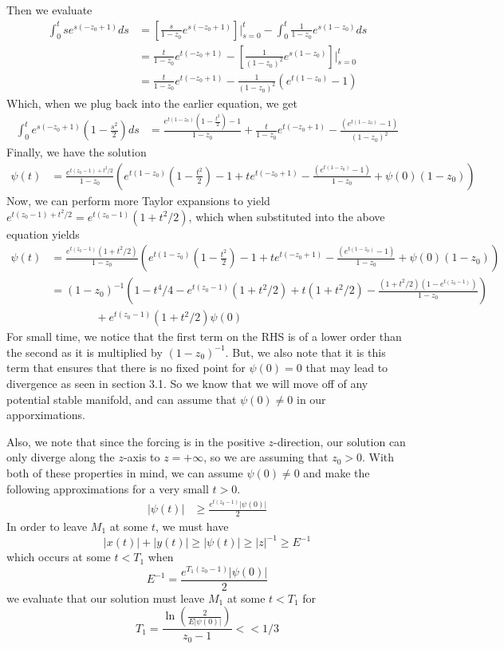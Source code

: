 \documentclass[11pt]{article}
\begin{document}
Then we evaluate 
\begin{align*}
    \int_0^t se^{s(-z_0 + 1)}ds &= \left[ \frac{s}{1- z_0} e^{s(-z_0 + 1)} \right]\bigg\rvert_{s = 0}^t - \int_0^t \frac{1}{1 - z_0}e^{s(1 - z_0)}ds\\
    &= \frac{t}{1- z_0} e^{t(-z_0 + 1)} - \left[ \frac{1}{(1-z_0)^2}e^{s(1 - z_0)} \right]\bigg\rvert_{s = 0}^t \\
    &= \frac{t}{1- z_0} e^{t(-z_0 + 1)} -  \frac{1}{(1-z_0)^2}\left(e^{t(1 - z_0)} - 1\right) 
\end{align*}
Which, when we plug back into the earlier equation, we get
\begin{align*}
    \int_0^t e^{s(-z_0 + 1)}\left(1 - \frac{s^2}{2}\right)ds &= \frac{e^{t(1-z_0)}\left( 1 - \frac{t^2}{2} \right) - 1}{1 - z_0} + \frac{t}{1- z_0} e^{t(-z_0 + 1)} -  \frac{\left(e^{t(1 - z_0)} - 1\right)}{(1-z_0)^2}
\end{align*}
Finally, we have the solution
\begin{align*}
    \psi(t) &=\frac{e^{t(z_0 - 1) + t^2/2}}{1-z_0}\left(e^{t(1-z_0)}\left( 1 - \frac{t^2}{2} \right) - 1 + t e^{t(-z_0 + 1)} -  \frac{\left(e^{t(1 - z_0)} - 1\right)}{1-z_0} + \psi(0)(1-z_0) \right)
\end{align*}
Now, we can perform more Taylor expansions to yield $e^{t(z_0 - 1) + t^2/2} = e^{t(z_0 - 1)}(1 + t^2/2)$, which when substituted into the above equation yields 
\begin{align*}
    \psi(t) &= \frac{e^{t(z_0 - 1)}(1 + t^2/2)}{1-z_0}\left(e^{t(1-z_0)}\left( 1 - \frac{t^2}{2} \right) - 1 + t e^{t(-z_0 + 1)} -  \frac{\left(e^{t(1 - z_0)} - 1\right)}{1-z_0} + \psi(0)(1-z_0) \right)\\
    &= (1-z_0)^{-1}\left(1 - t^4/4 - e^{t(z_0 - 1)}(1 + t^2/2) + t(1 + t^2/2) - \frac{(1 + t^2/2)(1 - e^{t(z_0 - 1)})}{1-z_0} \right)\\ &\qquad \qquad  + e^{t(z_0 - 1)}(1 + t^2/2)\psi(0)
\end{align*}
For small time, we notice that the first term on the RHS is of a lower order than the second as it is multiplied by $(1-z_0)^{-1}$. But, we also note that it is this term that ensures that there is no fixed point for $\psi(0) = 0$ that may lead to divergence as seen in section 3.1. So we know that we will move off of any potential stable manifold, and can assume that $\psi(0) \neq 0$ in our apporximations. 

Also, we note that since the forcing is in the positive $z$-direction, our solution can only diverge along the $z$-axis to $z = +\infty$, so we are assuming that $z_0 > 0$. With both of these properties in mind, we can assume $\psi(0) \neq 0$ and make the following approximations for a very small $t > 0$. 
\begin{align*}
    |\psi(t)| &\geq \frac{e^{t(z_0 - 1)}|\psi(0)|}{2} 
\end{align*}
In order to leave $M_1$ at some $t$, we must have $$|x(t)| + |y(t)| \geq |\psi(t)| \geq |z|^{-1} \geq E^{-1}$$which occurs at some $t < T_1$ when $$E^{-1} = \frac{e^{T_1(z_0 - 1)}|\psi(0)|}{2}$$we evaluate that our solution must leave $M_1$ at some $t < T_1$ for $$T_1 = \frac{\ln\left(\frac{2}{E|\psi(0)|} \right)}{z_0 - 1} << 1/3$$
\end{document}
